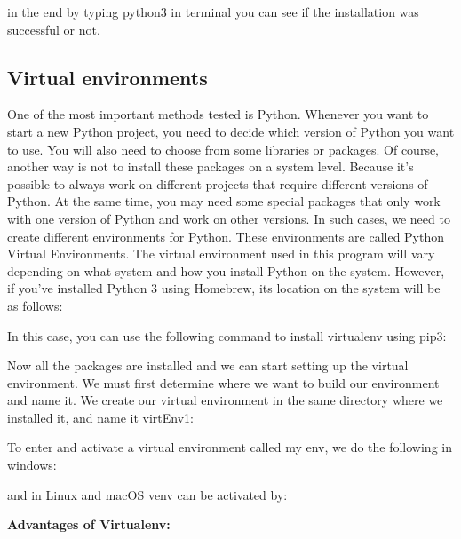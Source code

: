 \linebreak

in the end by typing python3 in terminal you can see if the installation was successful or not.

\subsection{Virtual environments}
One of the most important methods tested is Python. Whenever you want to start a new Python project, you need to decide which version of Python you want to use. You will also need to choose from some libraries or packages. Of course, another way is not to install these packages on a system level. Because it's possible to always work on different projects that require different versions of Python. At the same time, you may need some special packages that only work with one version of Python and work on other versions. In such cases, we need to create different environments for Python. These environments are called Python Virtual Environments. The virtual environment used in this program will vary depending on what system and how you install Python on the system. However, if you've installed Python 3 using Homebrew, its location on the system will be as follows:



In this case, you can use the following command to install virtualenv using pip3:




Now all the packages are installed and we can start setting up the virtual environment. We must first determine where we want to build our environment and name it. We create our virtual environment in the same directory where we installed it, and name it virtEnv1:


To enter and activate a virtual environment called my env, we do the following in windows:


and in Linux and macOS venv can be activated by:


\textbf{Advantages of Virtualenv:}

